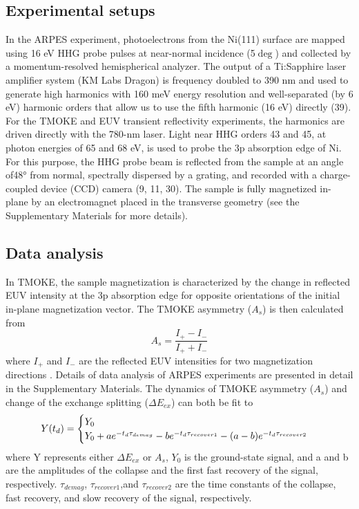\subsection{Experimental setups}
In the ARPES experiment, photoelectrons from the Ni(111) surface are mapped using 16 eV HHG probe pulses at near-normal incidence (5$\deg$) and collected by a momentum-resolved hemispherical analyzer. The output of a Ti:Sapphire laser amplifier system (KM Labs Dragon) is frequency doubled to 390 nm and used to generate high harmonics with 160 meV energy resolution and well-separated (by 6 eV) harmonic orders that allow us to use the fifth harmonic (16 eV) directly (39). For the TMOKE and EUV transient reflectivity experiments, the harmonics are driven directly with the 780-nm laser. Light near HHG orders 43 and 45, at photon energies of 65 and 68 eV, is used to probe the 3p absorption edge of Ni. For this purpose, the HHG probe beam is reflected from the sample at an angle of48° from normal, spectrally dispersed by a grating, and recorded with a charge-coupled device (CCD) camera (9, 11, 30). The sample is fully magnetized in-plane by an electromagnet placed in the transverse geometry (see the Supplementary Materials for more details).

\subsection{Data analysis}
In TMOKE, the sample magnetization is characterized by the change in reflected EUV intensity at the 3p absorption edge for opposite orientations of the initial in-plane magnetization vector. The TMOKE asymmetry ($A_s$) is then calculated from
\begin{equation}
A_{s}=\frac{I_{+}-I_{-}}{I_{+}+I_{-}}
\label{eqn:2}
\end{equation}
where $I_+$ and $I_−$ are the reflected EUV intensities for two magnetization directions \cite{La-O-Vorakiat2012,Mathias2012,La-O-Vorakiat2009}. Details of data analysis of ARPES experiments are presented in detail in the Supplementary Materials. The dynamics of TMOKE asymmetry ($A_s$) and change of the exchange splitting ($\Delta E_{ex}$) can both be fit to
\begin{equation*}
Y(t_{d}) = 
\begin{cases}
Y_0 \\
Y_0 + a e^{-t_d\/\tau_{demag}}-b e^{-t_d\/\tau_{recover1}}-(a-b)e^{-t_d\/\tau_{recover2}}
\end{cases}
\label{eqn:3}
\end{equation*} 
where Y represents either $\Delta E_{ex}$ or $A_s$, $Y_0$ is the ground-state signal, and a and b are the amplitudes of the collapse and the first fast recovery of the signal, respectively. $\tau_{demag}$, $\tau_{recover1}$,and $\tau_{recover2}$ are the time constants of the collapse, fast recovery, and slow recovery of the signal, respectively.

